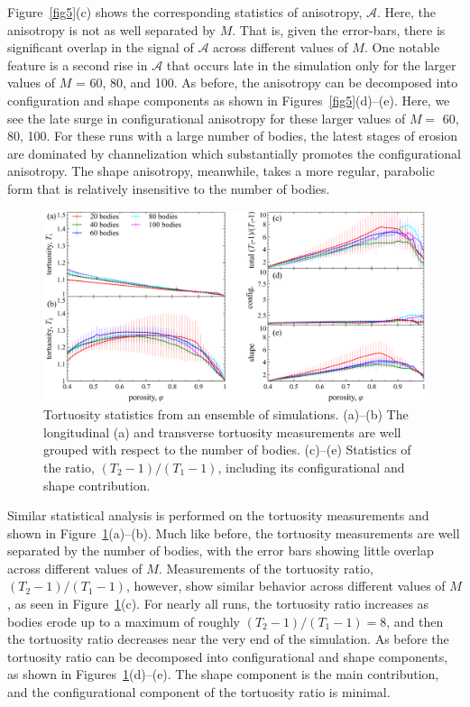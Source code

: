 \documentclass[3p]{elsarticle}
\newcommand{\anis}{\mathcal{A}}
\begin{document}
Figure~\ref{fig5}(c) shows the corresponding statistics of anisotropy, $\anis$. Here, the anisotropy is not as well separated by $M$. That is, given the error-bars, there is significant overlap in the signal of $\anis$ across different values of $M$. One notable feature is a second rise in $\anis$ that occurs late in the simulation only for the larger values of $M$ = 60, 80, and 100. As before, the anisotropy can be decomposed into configuration and shape components as shown in Figures~\ref{fig5}(d)--(e). Here, we see the late surge in configurational anisotropy for these larger values of $M = $ 60, 80, 100. For these runs with a large number of bodies, the latest stages of erosion are dominated by channelization which substantially promotes the configurational anisotropy. The shape anisotropy, meanwhile, takes a more regular, parabolic form that is relatively insensitive to the number of bodies.

\begin{figure}%
\centering
\includegraphics[width = 0.9 \textwidth]{./figs/fig6.pdf}
\caption{
Tortuosity statistics from an ensemble of simulations. (a)--(b) The longitudinal (a) and transverse tortuosity measurements are well grouped with respect to the number of bodies. (c)--(e) Statistics of the ratio, $(T_2 -1)/(T_1 -1)$, including its configurational and shape contribution.
\label{fig6}
}
\end{figure}

Similar statistical analysis is performed on the tortuosity measurements and shown in Figure~\ref{fig6}(a)--(b). Much like before, the tortuosity measurements are well separated by the number of bodies, with the error bars showing little overlap across different values of $M$. Measurements of the tortuosity ratio, $(T_2 -1)/(T_1 -1)$, however, show similar behavior across different values of $M$, as seen in Figure~\ref{fig6}(c). For nearly all runs, the tortuosity ratio increases as bodies erode up to a maximum of roughly $(T_2 -1)/(T_1 -1) = 8$, and then the tortuosity ratio decreases near the very end of the simulation. As before the tortuosity ratio can be decomposed into configurational and shape components, as shown in Figures~\ref{fig6}(d)--(e). The shape component is the main contribution, and the configurational component of the tortuosity ratio is minimal.
\end{document}
